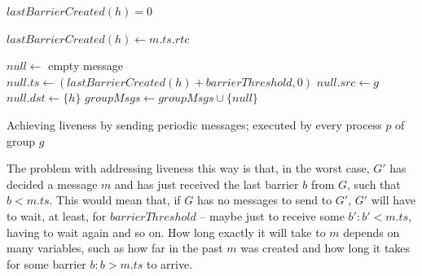 \documentclass[times, 10pt]{article}
\begin{document}
\begin{algorithm}
\begin{distribalgo}[1]
\blankline
{}
    \STATE $lastBarrierCreated(h) = 0$
  \ENDINDENT
\ENDINDENT

\blankline
{}
  \STATE $lastBarrierCreated(h) \leftarrow m.ts.rtc$
\ENDINDENT

\blankline
{}
  \STATE $null \leftarrow$ empty message
  \STATE $null.ts \leftarrow (lastBarrierCreated(h) + barrierThreshold, 0)$ \label{algline:samenullid}
  \STATE $null.src \leftarrow g$
  \STATE $null.dst \leftarrow \{h\}$ 
  \STATE $groupMsgs \leftarrow groupMsgs \cup \{null\}$
\ENDINDENT 

\blankline
\caption{Achieving liveness by sending periodic messages; executed by every process $p$ of group $g$}
\label{algorithm:nullperiodic}
\end{distribalgo} 
\end{algorithm}

The problem with addressing liveness this way is that, in the worst case, $G'$ has decided a message $m$ and has just received the last barrier $b$ from $G$, such that $b < m.ts$. This would mean that, if $G$ has no messages to send to $G'$, $G'$ will have to wait, at least, for $barrierThreshold$ -- maybe just to receive some $b' : b' < m.ts$, having to wait again and so on. How long exactly it will take to \cons{} $m$ depends on many variables, such as how far in the past $m$ was created and how long it takes for some barrier $b: b > m.ts$ to arrive.%
\end{document}
